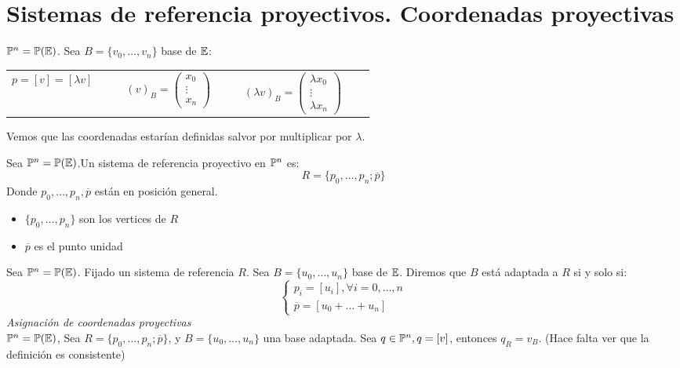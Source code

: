 \section[Sistemas de referencia proyectivos. Coordenadas proyectivas]
    {Sistemas de referencia proyectivos. Coordenadas proyectivas
    }

\begin{obs}
    $\mathbb{P}^n = \mathbb{P}(\mathbb{E})$. Sea $B = \{v_0, \dots, v_n\}$ base de $\mathbb{E}$:
    \begin{center} \begin{tabular}{ccc}
        $p = [v] = [\lambda v] \qquad $ &
        $(v)_B = \begin{pmatrix} x_0 \\ \vdots \\ x_n \end{pmatrix}\qquad $&
        $(\lambda v)_B = \begin{pmatrix} \lambda x_0 \\ \vdots \\ \lambda x_n \end{pmatrix} \qquad$
    \end{tabular} \end{center}
    Vemos que las coordenadas estarían definidas salvor por multiplicar por $\lambda$.
\end{obs}
\begin{defi}
    Sea $\mathbb{P}^n = \mathbb{P}(\mathbb{E})$.Un sistema de referencia proyectivo en $\mathbb{P}^n$ es:
        \[ R= \{ p_0, \dots, p_n; \overline{p} \} \]
    Donde $p_0, \dots, p_n, \overline{p}$ están en posición general.
        \begin{itemize}
            \item $\{ p_0, \dots, p_n \}$ son los vertices de $R$
            \item $\overline{p}$ es el punto unidad
        \end{itemize}
\end{defi}
\begin{defi}
    Sea $\mathbb{P}^n = \mathbb{P}(\mathbb{E})$. Fijado un sistema de referencia $R$. Sea $B = \{ u_0, \dots, u_n \}$ base de $\mathbb{E}$. Diremos que $B$ está adaptada a $R$ si y solo si:
        \[ \begin{cases} p_i = [u_i], \forall i = 0, \dots, n \\ \overline{p} = [u_0 + \dots + u_n ] \end{cases} \]
    \textit{Asignación de coordenadas proyectivas} \\
        $\mathbb{P}^n = \mathbb{P}(\mathbb{E})$, Sea $R = \{ p_0, \dots, p_n; \overline{p} \}$, y $B = \{u_0, \dots, u_n\}$ una base adaptada. Sea $q \in \mathbb{P}^n, q = [v]$, entonces
        $q_R = v_B$. (Hace falta ver que la definición es consistente)
\end{defi}
